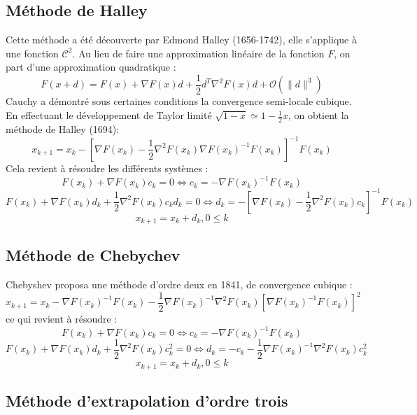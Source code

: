 \subsection{M\'ethode de Halley}
Cette m\'ethode a \'et\'e d\'ecouverte par Edmond Halley (1656-1742), elle s'applique \`a une fonction $\mathcal{C}^2$.
Au lieu de faire une approximation lin\'eaire de la fonction $F$, on part d'une approximation quadratique :
$$F(x+d)=F(x)+\nabla F(x)d + \frac{1}{2}d^T\nabla^2F(x)d + \mathcal{O}({\lVert d\rVert^3}) $$
Cauchy a d\'emontr\'e sous certaines conditions la convergence semi-locale cubique.
En effectuant le d\'eveloppement de Taylor limit\'e $\sqrt{1-x}\simeq 1-\frac{1}{2}x $, on obtient la m\'ethode de Halley (1694):
$$x_{k+1}=x_k-[\nabla F(x_k)-\frac{1}{2}\nabla^2F(x_k)\nabla F(x_k)^{-1}F(x_k)]^{-1}F(x_k)$$
%
Cela revient \`a r\'esoudre les diff\'erents syst\`emes : 
$$F(x_k)+\nabla F(x_k)c_k=0 \Leftrightarrow c_k=-\nabla F(x_k)^{-1}F(x_k)$$
$$F(x_k)+\nabla F(x_k)d_k+\frac{1}{2}\nabla^2F(x_k)c_kd_k=0  \Leftrightarrow  d_k=-[\nabla F(x_k)-\frac{1}{2}\nabla^2F(x_k)c_k]^{-1}F(x_k)$$
$$x_{k+1}=x_k+d_k, 0\leq k$$



\subsection{M\'ethode de Chebychev}


Chebyshev proposa une m\'ethode d'ordre deux en 1841, de convergence cubique :
\begin{equation}
x_{k+1}=x_k-\nabla F(x_k)^{-1}F(x_k)-\frac{1}{2}\nabla F(x_k)^{-1}\nabla^2F(x_k)[\nabla F(x_k)^{-1}F(x_k)]^2
\label{equ:cheb}
\end{equation}
ce qui revient \`a r\'esoudre :
$$F(x_k)+\nabla F(x_k)c_k=0 \Leftrightarrow c_k=-\nabla F(x_k)^{-1}F(x_k)$$
$$F(x_k)+\nabla F(x_k)d_k+\frac{1}{2}\nabla^2F(x_k)c_k^2=0 \Leftrightarrow  d_k=-c_k-\frac{1}{2}\nabla F(x_k)^{-1}\nabla^2F(x_k)c_k^2$$
$$x_{k+1}=x_k+d_k, 0\leq k$$




\subsection{M\'ethode d'extrapolation d'ordre trois}


